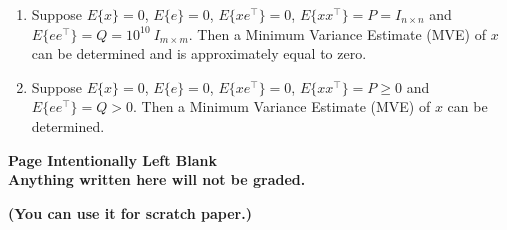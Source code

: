 \documentclass[letterpaper]{article}
\newcommand{\ExpectofGiven}[2]{{\cal E} \{ #1 | #2 \}}
\begin{document}
\begin{enumerate}
\begin{enumerate}
\item Suppose $E\{x\}=0$, $E\{e\}=0$, $E\{xe^\top\}=0$,  $E\{x x^\top\}=P = I_{n \times n}$  and $E\{e e^\top\}=Q=10^{10}~I_{m \times m}$. Then a Minimum Variance Estimate (MVE) of $x$ can be determined and is approximately equal to zero.

\item Suppose $E\{x\}=0$, $E\{e\}=0$, $E\{xe^\top\}=0$,  $E\{x x^\top\}=P \ge 0$  and $E\{e e^\top\}=Q > 0$. Then a  Minimum Variance Estimate (MVE) of $x$ can be determined.

\end{enumerate}


\newpage

\begin{center}
\vspace*{6cm}

{\bf \LARGE Page Intentionally Left Blank}\\

\vspace*{3cm}
\textbf{Anything written here will not be graded.}

\textbf{(You can use it for scratch paper.)}

\end{center}
\newpage



\end{enumerate}
\end{document}
